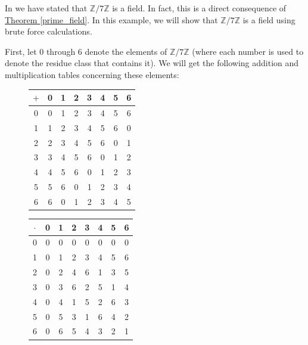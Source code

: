 \documentclass[openany, a4paper, 10pt]{book}
\theoremstyle{plain}
\theoremstyle{plain}
\theoremstyle{plain}
\theoremstyle{definition}
\theoremstyle{plain}
\theoremstyle{definition}
\theoremstyle{remark}
\newcommand{\theoref}[1]{\hyperref[#1]{Theorem \ref{#1}}}
\begin{document}
\begin{examplebox}
    In  we have stated that $\mathbb Z/7\mathbb Z$ is a field.
    In fact, this is a direct consequence of \theoref{prime_field}.
    In this example, we will show that $\mathbb Z / 7 \mathbb Z$ is a field using brute force calculations.

    First, let 0 through 6 denote the elements of $\mathbb Z / 7 \mathbb Z$ (where each number is used to denote the residue class that contains it).
    We will get the following addition and multiplication tables concerning these elements:
    \begin{figure}[H]
        \centering
        \begin{minipage}{.5\textwidth}
            \centering
            \begin{tabular}{c|ccccccc}
                $+$ & 0 & 1 & 2 & 3 & 4 & 5 & 6 \\
                \hline
                0 & 0 & 1 & 2 & 3 & 4 & 5 & 6 \\
                1 & 1 & 2 & 3 & 4 & 5 & 6 & 0 \\
                2 & 2 & 3 & 4 & 5 & 6 & 0 & 1 \\
                3 & 3 & 4 & 5 & 6 & 0 & 1 & 2 \\
                4 & 4 & 5 & 6 & 0 & 1 & 2 & 3 \\
                5 & 5 & 6 & 0 & 1 & 2 & 3 & 4 \\
                6 & 6 & 0 & 1 & 2 & 3 & 4 & 5 \\
            \end{tabular}
        \end{minipage}%
        \begin{minipage}{.5\textwidth}
            \centering
            \begin{tabular}{c|ccccccc}
                $\cdot$ & 0 & 1 & 2 & 3 & 4 & 5 & 6 \\
                \hline
                0 & 0 & 0 & 0 & 0 & 0 & 0 & 0 \\
                1 & 0 & 1 & 2 & 3 & 4 & 5 & 6 \\
                2 & 0 & 2 & 4 & 6 & 1 & 3 & 5 \\
                3 & 0 & 3 & 6 & 2 & 5 & 1 & 4 \\
                4 & 0 & 4 & 1 & 5 & 2 & 6 & 3 \\
                5 & 0 & 5 & 3 & 1 & 6 & 4 & 2 \\
                6 & 0 & 6 & 5 & 4 & 3 & 2 & 1 \\

\end{tabular}
\end{minipage}
\end{figure}
\end{examplebox}
\end{document}
